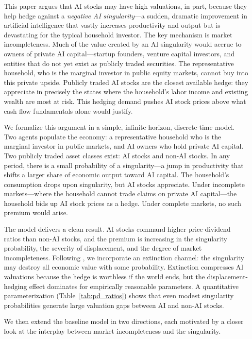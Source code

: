 \documentclass[12pt]{article}
\begin{document}
This paper argues that AI stocks may have high valuations, in part, because they help hedge against a \emph{negative AI singularity}---a sudden, dramatic improvement in artificial intelligence that vastly increases productivity and output but is devastating for the typical household investor. The key mechanism is market incompleteness. Much of the value created by an AI singularity would accrue to owners of private AI capital---startup founders, venture capital investors, and entities that do not yet exist as publicly traded securities. The representative household, who is the marginal investor in public equity markets, cannot buy into this private upside. Publicly traded AI stocks are the closest available hedge: they appreciate in precisely the states where the household's labor income and existing wealth are most at risk. This hedging demand pushes AI stock prices above what cash flow fundamentals alone would justify.

We formalize this argument in a simple, infinite-horizon, discrete-time model. Two agents populate the economy: a representative household who is the marginal investor in public markets, and AI owners who hold private AI capital. Two publicly traded asset classes exist: AI stocks and non-AI stocks. In any period, there is a small probability of a singularity---a jump in productivity that shifts a larger share of economic output toward AI capital. The household's consumption drops upon singularity, but AI stocks appreciate. Under incomplete markets---where the household cannot trade claims on private AI capital---the household bids up AI stock prices as a hedge. Under complete markets, no such premium would arise.

The model delivers a clean result. AI stocks command higher price-dividend ratios than non-AI stocks, and the premium is increasing in the singularity probability, the severity of displacement, and the degree of market incompleteness. Following \citet{Jones2024}, we incorporate an extinction channel: the singularity may destroy all economic value with some probability. Extinction compresses AI valuations because the hedge is worthless if the world ends, but the displacement-hedging effect dominates for empirically reasonable parameters. A quantitative parameterization (Table~\ref{tab:pd_ratios}) shows that even modest singularity probabilities generate large valuation gaps between AI and non-AI stocks.

We then extend the baseline model in two directions, each motivated by a closer look at the interplay between market incompleteness and the singularity.
\end{document}
